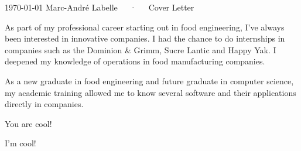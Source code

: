 \documentclass[letterpaper]{marckit-cv}
\begin{document}
\makecvheader[R]

\makecvfooter
  {\today}
  {Marc-André Labelle~~~·~~~Cover Letter}         %
  {}

\makelettertitle

\begin{cvletter}
    As part of my professional career starting out in food engineering,
    I've always been interested in innovative companies.
    I had the chance to do internships in companies such
    as the Dominion \& Grimm, Sucre Lantic and Happy Yak.
    I deepened my knowledge of
    operations in food manufacturing companies.

    As a new graduate in food engineering
    and future graduate in computer science, my academic training
    allowed me to know several software
    and their applications directly in companies.

    You are cool!

    I'm cool!

\end{cvletter}


\makeletterclosing
\end{document}
